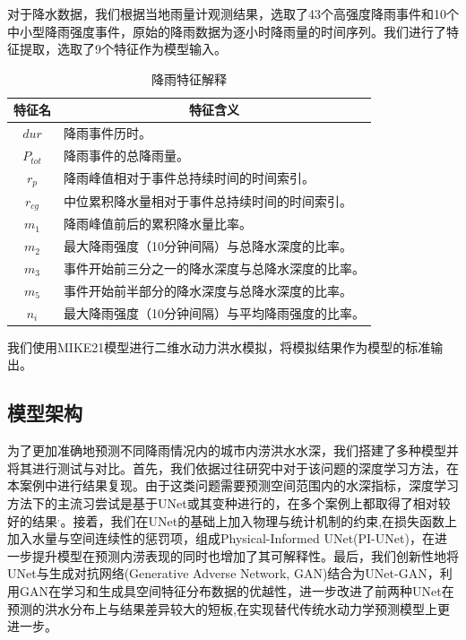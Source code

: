 \documentclass[12pt, a4paper]{article}
\begin{document}
对于降水数据，我们根据当地雨量计观测结果，选取了43个高强度降雨事件和10个中小型降雨强度事件，原始的降雨数据为逐小时降雨量的时间序列。我们进行了特征提取，选取了9个特征作为模型输入。
\begin{table}[H]
    \centering
    \begin{tabular}{|c|l|}
    \hline
    \textbf{特征名} & \multicolumn{1}{c|}{\textbf{特征含义}} \\
    \hline
    $dur$ & 降雨事件历时。 \\
    \hline
    $P_{tot}$ & 降雨事件的总降雨量。 \\
    \hline
    $r_p$ & 降雨峰值相对于事件总持续时间的时间索引。 \\
    \hline
    $r_{cg}$ & 中位累积降水量相对于事件总持续时间的时间索引。 \\
    \hline
    $m_1$ & 降雨峰值前后的累积降水量比率。 \\
    \hline
    $m_2$ & 最大降雨强度（10分钟间隔）与总降水深度的比率。 \\
    \hline
    $m_3$ & 事件开始前三分之一的降水深度与总降水深度的比率。 \\
    \hline
    $m_5$ & 事件开始前半部分的降水深度与总降水深度的比率。 \\
    \hline
    $n_i$ & 最大降雨强度（10分钟间隔）与平均降雨强度的比率。 \\
    \hline
    \end{tabular}
    \caption{降雨特征解释}
    \label{t2}
\end{table}

我们使用MIKE21模型进行二维水动力洪水模拟，将模拟结果作为模型的标准输出。

\subsection{模型架构}

为了更加准确地预测不同降雨情况内的城市内涝洪水水深，我们搭建了多种模型并将其进行测试与对比。首先，我们依据过往研究中对于该问题的深度学习方法，在本案例中进行结果复现。由于这类问题需要预测空间范围内的水深指标，深度学习方法下的主流习尝试是基于UNet或其变种进行的，在多个案例上都取得了相对较好的结果$^,$。接着，我们在UNet的基础上加入物理与统计机制的约束,在损失函数上加入水量与空间连续性的惩罚项，组成Physical-Informed UNet(PI-UNet)，在进一步提升模型在预测内涝表现的同时也增加了其可解释性。最后，我们创新性地将UNet与生成对抗网络(Generative Adverse Network, GAN)结合为UNet-GAN，利用GAN在学习和生成具空间特征分布数据的优越性，进一步改进了前两种UNet在预测的洪水分布上与结果差异较大的短板,在实现替代传统水动力学预测模型上更进一步。
\end{document}
